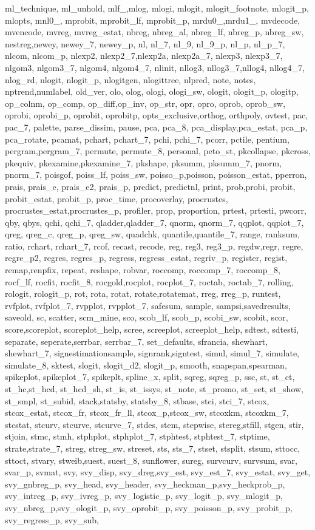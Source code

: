 {{ml_technique, ml_unhold, mlf_,mlog, mlogi, mlogit, mlogit_footnote, mlogit_p, mlopts, mnl0_, mprobit, mprobit_lf, mprobit_p, mrdu0_,mrdu1_, mvdecode, mvencode, mvreg, mvreg_estat, nbreg, nbreg_al, nbreg_lf, nbreg_p, nbreg_sw, nestreg,newey, newey_7, newey_p, nl, nl_7, nl_9, nl_9_p, nl_p, nl_p_7, nlcom, nlcom_p, nlexp2, nlexp2_7,nlexp2a, nlexp2a_7, nlexp3, nlexp3_7, nlgom3, nlgom3_7, nlgom4, nlgom4_7, nlinit, nllog3, nllog3_7,nllog4, nllog4_7, nlog_rd, nlogit, nlogit_p, nlogitgen, nlogittree, nlpred, note, notes, nptrend,numlabel, old_ver, olo, olog, ologi, ologi_sw, ologit, ologit_p, ologitp, op_colnm, op_comp, op_diff,op_inv, op_str, opr, opro, oprob, oprob_sw, oprobi, oprobi_p, oprobit, oprobitp, opts_exclusive,orthog, orthpoly, ovtest, pac, pac_7, palette, parse_dissim, pause, pca, pca_8, pca_display,pca_estat, pca_p, pca_rotate, pcamat, pchart, pchart_7, pchi, pchi_7, pcorr, pctile, pentium, pergram,pergram_7, permute, permute_8, personal, peto_st, pkcollapse, pkcross, pkequiv, pkexamine,pkexamine_7, pkshape, pksumm, pksumm_7, pnorm, pnorm_7, poisgof, poiss_lf, poiss_sw, poisso_p,poisson, poisson_estat, pperron, prais, prais_e, prais_e2, prais_p, predict, predictnl, print, prob,probi, probit, probit_estat, probit_p, proc_time, procoverlay, procrustes, procrustes_estat,procrustes_p, profiler, prop, proportion, prtest, prtesti, pwcorr, qby, qbys, qchi, qchi_7, qladder,qladder_7, qnorm, qnorm_7, qqplot, qqplot_7, qreg, qreg_c, qreg_p, qreg_sw, quadchk, quantile,quantile_7, range, ranksum, ratio, rchart, rchart_7, rcof, recast, recode, reg, reg3, reg3_p, regdw,regr, regre, regre_p2, regres, regres_p, regress, regress_estat, regriv_p, register, regist, remap,renpfix, repeat, reshape, robvar, roccomp, roccomp_7, roccomp_8, rocf_lf, rocfit, rocfit_8, rocgold,rocplot, rocplot_7, roctab, roctab_7, rolling, rologit, rologit_p, rot, rota, rotat, rotate,rotatemat, rreg, rreg_p, runtest, rvfplot, rvfplot_7, rvpplot, rvpplot_7, safesum, sample, sampsi,savedresults, saveold, sc, scatter, scm_mine, sco, scob_lf, scob_p, scobi_sw, scobit, scor, score,scoreplot, scoreplot_help, scree, screeplot, screeplot_help, sdtest, sdtesti, separate, seperate,serrbar, serrbar_7, set_defaults, sfrancia, shewhart, shewhart_7, signestimationsample, signrank,signtest, simul, simul_7, simulate, simulate_8, sktest, slogit, slogit_d2, slogit_p, smooth, snapspan,spearman, spikeplot, spikeplot_7, spikeplt, spline_x, split, sqreg, sqreg_p, ssc, st, st_ct, st_hc,st_hcd, st_hcd_sh, st_is, st_issys, st_note, st_promo, st_set, st_show, st_smpl, st_subid, stack,statsby, statsby_8, stbase, stci, stci_7, stcox, stcox_estat, stcox_fr, stcox_fr_ll, stcox_p,stcox_sw, stcoxkm, stcoxkm_7, stcstat, stcurv, stcurve, stcurve_7, stdes, stem, stepwise, stereg,stfill, stgen, stir, stjoin, stmc, stmh, stphplot, stphplot_7, stphtest, stphtest_7, stptime, strate,strate_7, streg, streg_sw, streset, sts, sts_7, stset, stsplit, stsum, sttocc, sttoct, stvary, stweib,suest, suest_8, sunflower, sureg, survcurv, survsum, svar, svar_p, svmat, svy, svy_disp, svy_dreg,svy_est, svy_est_7, svy_estat, svy_get, svy_gnbreg_p, svy_head, svy_header, svy_heckman_p,svy_heckprob_p, svy_intreg_p, svy_ivreg_p, svy_logistic_p, svy_logit_p, svy_mlogit_p, svy_nbreg_p,svy_ologit_p, svy_oprobit_p, svy_poisson_p, svy_probit_p, svy_regress_p, svy_sub, }}
